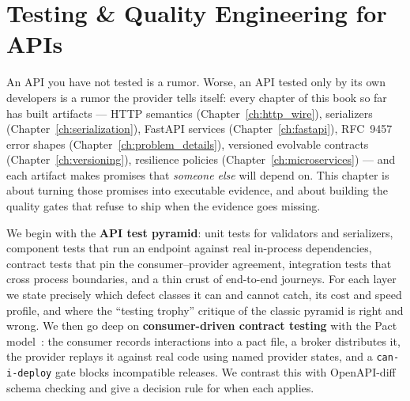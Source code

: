 \chapter{Testing \& Quality Engineering for APIs}
\label{ch:testing}

An API you have not tested is a rumor. Worse, an API tested only by its own
developers is a rumor the provider tells itself: every chapter of this book
so far has built artifacts --- HTTP semantics (Chapter~\ref{ch:http_wire}),
serializers (Chapter~\ref{ch:serialization}), FastAPI services
(Chapter~\ref{ch:fastapi}), RFC~9457 error shapes
(Chapter~\ref{ch:problem_details}), versioned evolvable contracts
(Chapter~\ref{ch:versioning}), resilience policies
(Chapter~\ref{ch:microservices}) --- and each artifact makes promises that
\emph{someone else} will depend on. This chapter is about turning those
promises into executable evidence, and about building the quality gates that
refuse to ship when the evidence goes missing.

We begin with the \textbf{API test pyramid}: unit tests for validators and
serializers, component tests that run an endpoint against real in-process
dependencies, contract tests that pin the consumer--provider agreement,
integration tests that cross process boundaries, and a thin crust of
end-to-end journeys. For each layer we state precisely which defect classes
it can and cannot catch, its cost and speed profile, and where the
``testing trophy'' critique of the classic pyramid is right and wrong.
We then go deep on \textbf{consumer-driven contract testing} with the Pact
model~\cite{pactdocs}: the consumer records interactions into a pact file,
a broker distributes it, the provider replays it against real code using
named provider states, and a \texttt{can-i-deploy} gate blocks incompatible
releases. We contrast this with OpenAPI-diff schema checking
\cite{openapi31} and give a decision rule for when each applies.

